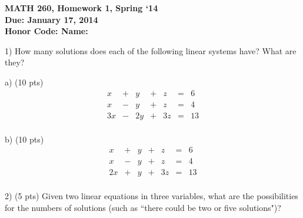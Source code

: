 \documentclass{article}
\begin{document}
\begin{flushleft}
	\bfseries{MATH 260, Homework 1, Spring `14}\\
	\bfseries{Due: January 17, 2014}\\
	\bfseries{Honor Code:} \hspace{3.5in}\bfseries{Name:}\\
\end{flushleft}
\begin{flushleft}
\vspace{.25in}

1) How many solutions does each of the following linear systems have?  What are they?

\vspace{0.2in}

a) (10 pts)
\begin{equation*}
\begin{array}{ccccccr}
x  & + &  y & + &  z & = & 6\\
x  & - &  y & + &  z & = & 4\\
3x & - & 2y & + & 3z & = & 13\\
\end{array}
\end{equation*}

\vspace{2.5in}

b) (10 pts)
\begin{equation*}
\begin{array}{ccccccr}
x  & + &  y & + &  z & = & 6\\
x  & - &  y & + &  z & = & 4\\
2x & + &  y & + & 3z & = & 13\\
\end{array}
\end{equation*}

\vspace{2.5in}

2) (5 pts) Given two linear equations in three variables, what are the possibilities for the numbers of solutions (such as ``there could be two or five solutions")?




\end{flushleft}
\end{document}
